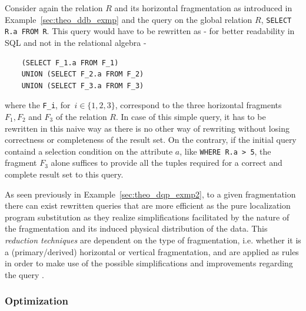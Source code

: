\begin{exmp}
\label{sec:theo_dqp_exmp2}
Consider again the relation $R$ and its horizontal fragmentation as introduced in Example~\ref{sec:theo_ddb_exmp} and the query on the global relation $R$,
\verb!SELECT R.a FROM R!. This query would have to be rewritten as - for better readability in SQL and not in the relational algebra -
\begin{verbatim}
    (SELECT F_1.a FROM F_1) 
    UNION (SELECT F_2.a FROM F_2) 
    UNION (SELECT F_3.a FROM F_3)
\end{verbatim}
where the \verb!F_i!, for~$i\in\{1,2,3\}$, correspond to the three horizontal fragments $F_1, F_2$ and $F_3$ of the relation $R$. In case of this simple 
query, it has to be rewritten in this naive way as there is no other way of rewriting without losing correctness or completeness of the result set. 
On the contrary, if the initial query containd a selection condition on the attribute $a$, like \verb!WHERE R.a > 5!, the fragment $F_3$ alone suffices 
to provide all the tuples required for a correct and complete result set to this query.
\end{exmp}

As seen previously in Example~\ref{sec:theo_dqp_exmp2}, to a given fragmentation there can exist rewritten queries that are more efficient as the pure
localization program substitution as they realize simplifications facilitated by the nature of the fragmentation and its induced physical distribution of
the data. This \emph{reduction techniques} are dependent on the type of fragmentation, i.e. whether it is a (primary/derived) horizontal or vertical
fragmentation, and are applied as rules in order to make use of the possible simplifications and improvements regarding the query
\cite[p.~199ff.]{Ozsu1991}.


\subsubsection{Optimization}
\label{sec:theo_dqp_opt}